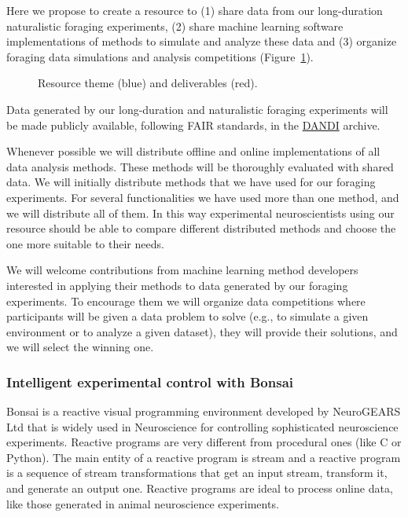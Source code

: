 Here we propose to create a resource to (1) share data from our long-duration
naturalistic foraging experiments, (2) share machine learning software
implementations of methods to simulate and analyze these data and (3) organize
foraging data simulations and analysis competitions (Figure~\ref{fig:resource}).

\begin{figure}
    \begin{center}
        
    \end{center}
    \caption{Resource theme (blue) and deliverables (red).}
    \label{fig:resource}
\end{figure}

Data generated by our long-duration and naturalistic foraging experiments will
be made publicly available, following FAIR standards, in the
\href{https://dandiarchive.org/}{DANDI} archive.

Whenever possible we will distribute offline and online implementations of all
data analysis methods. These methods will be thoroughly evaluated with shared
data.
%
We will initially distribute methods that we have used for our foraging
experiments. For several functionalities we have used more than one method, and
we will distribute all of them. In this way experimental neuroscientists using
our resource should be able to compare different distributed methods and choose
the one more suitable to their needs.

We will welcome contributions from machine learning method developers
interested in applying their methods to data generated by our foraging
experiments. To encourage them we will organize data
competitions where participants will be given a data problem to solve (e.g., to
simulate a given environment or to analyze a given dataset), they will provide
their solutions, and we will select the winning one.

\subsubsection*{Intelligent experimental control with Bonsai}

Bonsai is a reactive visual programming environment developed by NeuroGEARS Ltd
that is widely used in Neuroscience for controlling sophisticated neuroscience
experiments. Reactive programs are very different from procedural ones (like C
or Python). The main entity of a reactive program is stream and a reactive
program is a sequence of stream transformations that get an input stream,
transform it, and generate an output one. Reactive programs are ideal to
process online data, like those generated in animal neuroscience experiments.

